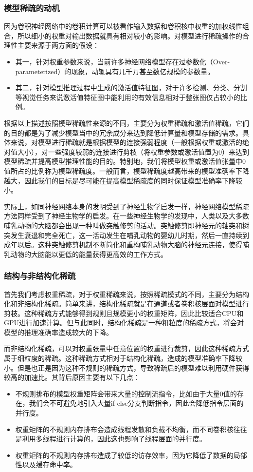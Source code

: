 \subsubsection{模型稀疏的动机}
因为卷积神经网络中的卷积计算可以被看作输入数据和卷积核中权重的加权线性组合，所以细小的权重对输出数据就具有相对较小的影响。对模型进行稀疏操作的合理性主要来源于两方面的假设：
\begin{itemize}
    \item 其一，针对权重参数来说，当前许多神经网络模型存在过参数化（Over-parameterized）的现象，动辄具有几千万甚至数亿规模的参数量。
    \item 其二，针对模型推理过程中生成的激活值特征图，对于许多检测、分类、分割等视觉任务来说激活值特征图中能利用的有效信息相对于整张图仅占较小的比例。
\end{itemize}

根据以上描述按照模型稀疏性来源的不同，主要分为权重稀疏和激活值稀疏，它们的目的都是为了减少模型当中的冗余成分来达到降低计算量和模型存储的需求。具体来说，对模型进行稀疏就是根据模型的连接强弱程度（一般根据权重或激活的绝对值大小），对一些强度较弱的连接进行剪枝（将权重参数或激活值置为0）来达到模型稀疏并提高模型推理性能的目的。特别地，我们将模型权重或激活值张量中0值所占的比例称为模型稀疏度。一般而言，模型稀疏度越高带来的模型准确率下降越大，因此我们的目标是尽可能在提高模型稀疏度的同时保证模型准确率下降较小。

实际上，如同神经网络本身的发明受到了神经生物学启发一样，神经网络模型稀疏方法同样受到了神经生物学的启发。在一些神经生物学的发现中，人类以及大多数哺乳动物的大脑都会出现一种叫做突触修剪的活动。突触修剪即神经元的轴突和树突发生衰退和完全死亡，这一活动发生在哺乳动物的婴幼儿时期，然后一直持续到成年以后。这种突触修剪机制不断简化和重构哺乳动物大脑的神经元连接，使得哺乳动物的大脑能以更低的能量获得更高效的工作方式。

\subsubsection{结构与非结构化稀疏}
首先我们考虑权重稀疏，对于权重稀疏来说，按照稀疏模式的不同，主要分为结构化和非结构化稀疏。简单来讲，结构化稀疏就是在通道或者卷积核层面对模型进行剪枝。这种稀疏方式能够得到规则且规模更小的权重矩阵，因此比较适合CPU和GPU进行加速计算。但与此同时，结构化稀疏是一种粗粒度的稀疏方式，将会对模型的推理准确率造成较大的下降。

而非结构化稀疏，可以对权重张量中任意位置的权重进行裁剪，因此这种稀疏方式属于细粒度的稀疏。这种稀疏方式相对于结构化稀疏，造成的模型准确率下降较小。但是也正是因为这种不规则的稀疏方式，导致稀疏后的模型难以利用硬件获得较高的加速比。其背后原因主要有以下几点：
\begin{itemize}
    \item 不规则排布的模型权重矩阵会带来大量的控制流指令，比如由于大量0值的存在，我们会不可避免地引入大量if-else分支判断指令，因此会降低指令层面的并行度。
    \item 权重矩阵的不规则内存排布会造成线程发散和负载不均衡，而不同卷积核往往是利用多线程进行计算的，因此这也影响了线程层面的并行度。
    \item 权重矩阵的不规则内存排布造成了较低的访存效率，因为它降低了数据的局部性以及缓存命中率。
\end{itemize}

